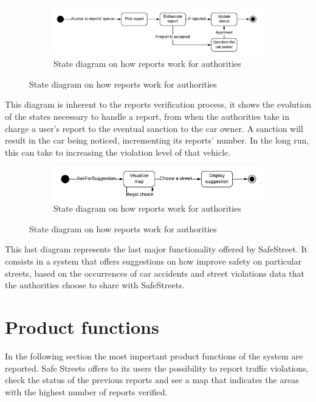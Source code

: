 \documentclass[12pt,a4paper]{report}
\begin{document}
		\begin{figure}[H]
			\begin{subfigure}{\textwidth}
				\includegraphics[scale = 0.75, center]{reportA}
				\caption{State diagram on how reports work for authorities}
			\end{subfigure}
		\end{figure}	
		This diagram is inherent to the reports verification process,
		it shows the evolution of the states necessary to handle a report, from when the authorities take in charge a user's report
		to the eventual sanction to the car owner. A sanction will result in the car being noticed, incrementing its reports' number. In the long run, this can take to increasing the violation level of that vehicle.
		
		\begin{figure}[H]
			\begin{subfigure}{\textwidth}
				\includegraphics[scale = 0.75, center]{suggestion}
				\caption{State diagram on how reports work for authorities}
			\end{subfigure}
		\end{figure}
		This last diagram represents the last major functionality offered by SafeStreet. It consists in a system that offers suggestions
		on how improve safety on particular streets, based on the occurrences of car accidents and street violations data that
		the authorities choose to share with SafeStreets.
		  
		
	\section{Product functions}
		In the following section the most important product functions of the system are reported.
		Safe Streets offers to its users the possibility to report traffic violations, check the status of the previous reports and see 
		a map that indicates the areas with the highest number of reports verified.
\end{document}
